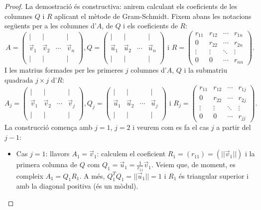 \begin{proof}
La demostració és constructiva: anirem calculant els coeficients de les columnes $Q$ i $R$ aplicant el mètode de Gram-Schmidt. Fixem abans les notacions següents per a les columnes d'$A$, de $Q$ i els coeficients de $R$:
\[
A=\begin{pmatrix} | & | & & | \\ \vec v_1 & \vec v_2 & \cdots & \vec v_n \\ | & | & & | \end{pmatrix} ,
Q=\begin{pmatrix} | & | & & | \\ \vec u_1 & \vec u_2 & \cdots & \vec u_n \\ | & | & & | \end{pmatrix} 
\text{ i }
R=\begin{pmatrix} r_{11} & r_{12} & \cdots & r_{1n} \\ 0 & r_{22} & \cdots & r_{2n} \\ \vdots & \vdots & \ddots & \vdots \\ 0 & 0 & \cdots & r_{nn}\end{pmatrix}.
\]
I les matrius formades per les primeres $j$ columnes d'$A$, $Q$ i la submatriu quadrada $j\times j$ d'$R$:
\[
A_j=\begin{pmatrix} | & | & & | \\ \vec v_1 & \vec v_2 & \cdots & \vec v_j\\ | & | & & | \end{pmatrix} ,
Q_j=\begin{pmatrix} | & | & & | \\ \vec u_1 & \vec u_2 & \cdots & \vec u_j \\ | & | & & | \end{pmatrix} 
\text{ i }
R_j=\begin{pmatrix} r_{11} & r_{12} & \cdots & r_{1j} \\ 0 & r_{22} & \cdots & r_{2j} \\ \vdots & \vdots & \ddots & \vdots \\ 0 & 0 & \cdots & r_{jj}\end{pmatrix}.
\]
La construcció comença amb $j=1$, $j=2$ i veurem com es fa el cas $j$ a partir del $j-1$:
\begin{itemize}
    \item Cas $j=1$: llavors $A_1=\vec v_1$: calculem el coeficient $R_1=(r_{11})=(||\vec v_1||)$ i la primera columna de $Q$ com $Q_1=\vec u_1=\frac{1}{r_{11}}\vec v_1$. Veiem que, de moment, es compleix  $A_1=Q_1R_1$. A més, $Q_1^TQ_1=||\vec u_1||=1$ i $R_1$ és triangular superior i amb la diagonal positiva (és un mòdul).

\end{itemize}
\end{proof}
